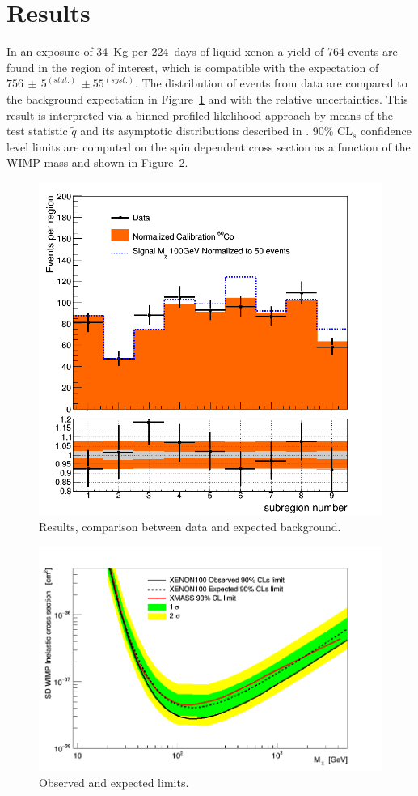 \section{Results}
In an exposure of 34~Kg per 224~days of liquid xenon a yield of 764 events are found in the region of interest,
which is compatible with the expectation of $756 \, \pm \, 5^{(stat.)} \, \pm 55^{(syst.)}$. The distribution 
of events from data are compared to the background expectation in Figure~\ref{fig:dataVSbkg} and with the relative
uncertainties.  
This result is interpreted via a binned profiled likelihood approach by means of the test statistic $\tilde{q}$
and its asymptotic distributions described in \cite{asympt}. 90\% CL$_s$ \cite{cls} confidence level limits are 
computed on the spin dependent cross section as a function of the WIMP mass and shown in Figure~\ref{fig:limits}.

\newpage
\begin{figure}[t!]
  \includegraphics[width=\linewidth]{images/data_vs_bkg.png}
  \caption{Results, comparison between data and expected background.}
  \label{fig:dataVSbkg}
\end{figure}

\begin{figure}[h]
  \includegraphics[width=\linewidth]{images/limit_reb.png}
  \caption{Observed and expected limits.}
  \label{fig:limits}
\end{figure}


\newpage

